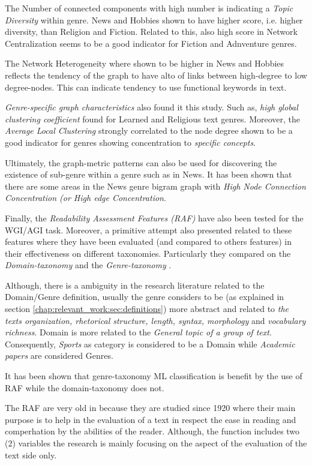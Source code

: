 The Number of connected components with high number is indicating a \textit{Topic Diversity} within genre. News and Hobbies shown to have higher score, i.e. higher diversity, than Religion and Fiction. Related to this, also high score in Network Centralization seems to be a good indicator for Fiction and Adnventure genres.

The Network Heterogeneity where shown to be higher in News and Hobbies reflects the tendency of the graph to have alto of links between high-degree to low degree-nodes. This can indicate tendency to use functional keywords in text.

\textit{Genre-specific graph characteristics} also found it this study. Such as, \textit{high global clustering coefficient} found for Learned and Religious text genres. Moreover, the \textit{Average Local Clustering} strongly correlated to the node degree shown to be a good indicator for genres showing concentration to \textit{specific concepts}.

Ultimately, the graph-metric patterns can also be used for discovering the existence of sub-genre within a genre such as in News. It has been shown that there are some areas in the News genre bigram graph with \textit{High Node Connection Concentration (or High edge Concentration}.  

Finally, the \textit{Readability Assessment Features (RAF)} have also been tested for the WGI/AGI task. Moreover, a primitive attempt also presented related to these features where they have been evaluated (and compared to others features) in their effectiveness on different taxonomies. Particularly they compared on the \textit{Domain-taxonomy} and the \textit{Genre-taxonomy} \parencite{falkenjack2016exploratory}.

Although, there is a ambiguity in the research literature related to the Domain/Genre definition, usually the genre considers to be (as explained in section \ref{chap:relevant_work:sec:definitions}) more abstract and related to \textit{the texts organization, rhetorical structure, length, syntax, morphology} and \textit{vocabulary richness}. Domain is more related to the \textit{General topic of a group of text}. Consequently, \textit{Sports} as category is considered to be a Domain while \textit{Academic papers} are considered Genres.

It has been shown that genre-taxonomy ML classification is benefit by the use of RAF while the domain-taxonomy does not. 

The RAF are very old in because they are studied since 1920 where their main purpose is to help in the evaluation of a text in respect the ease in reading and comperhation by the abilities of the reader. Although, the function includes two (2) variables the research is mainly focusing on the aspect of the evaluation of the text side only. 


